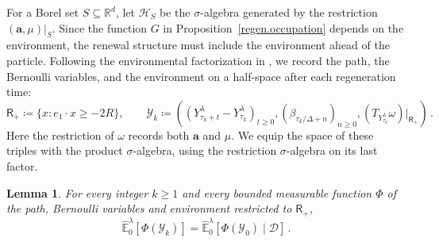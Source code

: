 \documentclass[11pt]{amsart}
\newtheorem{lemma}[proposition]{Lemma}
\theoremstyle{definition}
\theoremstyle{remark}
\numberwithin{equation}{section}
\newcommand{\R}{\mathbb R}
\renewcommand{\a}{\mathbf a}
\begin{document}
For a Borel set $S\subseteq\R^d$, let $\mathcal H_S$ be the $\sigma$-algebra generated by the restriction $(\a,\mu)|_S$. Since the function $G$ in Proposition~\ref{regen.occupation} depends on the environment, the renewal structure must include the environment ahead of the particle. Following the environmental factorization in \citet[Theorem~2.4]{ballistic2003shen}, we record the path, the Bernoulli variables, and the environment on a half-space after each regeneration time:
\begin{equation}\label{regen.future}
 \mathsf R_+\coloneqq\{x:e_1\cdot x\geq-2R\},\qquad
 \mathcal Y_k\coloneqq\left(
 (Y^\lambda_{\tau_k+t}-Y^\lambda_{\tau_k})_{t\geq0},
 (\beta_{\tau_k/\Delta+n})_{n\geq0},
 (T_{Y^\lambda_{\tau_k}}\omega)|_{\mathsf R_+}
 \right)\, .
\end{equation}
Here the restriction of $\omega$ records both $\a$ and $\mu$. We equip the space of these triples with the product $\sigma$-algebra, using the restriction $\sigma$-algebra on its last factor.

\begin{lemma}\label{regen.renewal}
For every integer $k\geq1$ and every bounded measurable function $\Phi$ of the path, Bernoulli variables and environment restricted to $\mathsf R_+$,
\begin{equation}\label{regen.marginal}
 \widehat{\mathbb E}^\lambda_0[\Phi(\mathcal Y_k)]
 =\widehat{\mathbb E}^\lambda_0[\Phi(\mathcal Y_0)\mid\mathcal D]\, .
\end{equation}
\end{lemma}
\end{document}
